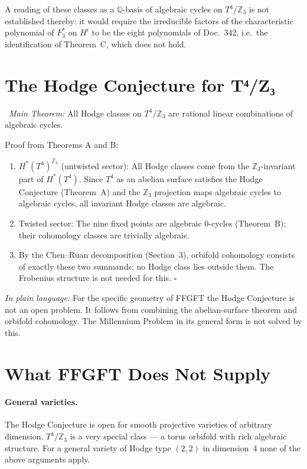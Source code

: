 A reading of these classes as a $\mathbb{Q}$-basis of algebraic cycles on
$T^4/\mathbb{Z}_3$ is not established thereby: it would require the
irreducible factors of the characteristic polynomial of $F_3^*$ on $H^i$ to
be the eight polynomials of Doc.~342, i.e.\ the identification of
Theorem~C, which does not hold.

\section{The Hodge Conjecture for T⁴/Z₃}

\BM\ \textit{Main Theorem:} All Hodge classes on $T^4/\mathbb{Z}_3$ are
rational linear combinations of algebraic cycles.

Proof from Theorems A and B:
\begin{enumerate}
\item $H^*(T^4)^{\mathbb{Z}_3}$ (untwisted sector): All Hodge classes come
      from the $\mathbb{Z}_3$-invariant part of $H^*(T^4)$. Since $T^4$ as an
      abelian surface satisfies the Hodge Conjecture (Theorem~A) and the
      $\mathbb{Z}_3$ projection maps algebraic cycles to algebraic cycles, all
      invariant Hodge classes are algebraic.
\item Twisted sector: The nine fixed points are algebraic 0-cycles (Theorem~B);
      their cohomology classes are trivially algebraic.
\item By the Chen--Ruan decomposition (Section~3), orbifold cohomology
      consists of exactly these two summands; no Hodge class lies outside
      them. The Frobenius structure is not needed for this. \hfill$\square$
\end{enumerate}

\noindent\textit{In plain language:} For the specific geometry of FFGFT the
Hodge Conjecture is not an open problem. It follows from combining the
abelian-surface theorem and orbifold cohomology. The
Millennium Problem in its general form is not solved by this.

\section{What FFGFT Does Not Supply}

\paragraph{General varieties.}
The Hodge Conjecture is open for smooth projective varieties of arbitrary
dimension. $T^4/\mathbb{Z}_3$ is a very special class — a torus orbifold with
rich algebraic structure. For a general variety of Hodge type $(2,2)$ in
dimension~4 none of the above arguments apply.

